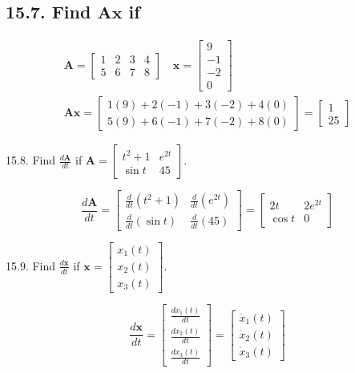 \documentclass[10pt]{article}
\begin{document}
\subsection*{15.7. Find $\mathbf{A x}$ if}
$$
\begin{gathered}
\mathbf{A}=\left[\begin{array}{llll}
1 & 2 & 3 & 4 \\
5 & 6 & 7 & 8
\end{array}\right] \quad \mathbf{x}=\left[\begin{array}{r}
9 \\
-1 \\
-2 \\
0
\end{array}\right] \\
\mathbf{A x}=\left[\begin{array}{c}
1(9)+2(-1)+3(-2)+4(0) \\
5(9)+6(-1)+7(-2)+8(0)
\end{array}\right]=\left[\begin{array}{c}
1 \\
25
\end{array}\right]
\end{gathered}
$$

15.8. Find $\frac{d \mathbf{A}}{d t}$ if $\mathbf{A}=\left[\begin{array}{cc}t^{2}+1 & e^{2 t} \\ \sin t & 45\end{array}\right]$.

$$
\frac{d \mathbf{A}}{d t}=\left[\begin{array}{ll}
\frac{d}{d t}\left(t^{2}+1\right) & \frac{d}{d t}\left(e^{2 t}\right) \\
\frac{d}{d t}(\sin t) & \frac{d}{d t}(45)
\end{array}\right]=\left[\begin{array}{cc}
2 t & 2 e^{2 t} \\
\cos t & 0
\end{array}\right]
$$

15.9. Find $\frac{d \mathbf{x}}{d t}$ if $\mathbf{x}=\left[\begin{array}{l}x_{1}(t) \\ x_{2}(t) \\ x_{3}(t)\end{array}\right]$.

$$
\frac{d \mathbf{x}}{d t}=\left[\begin{array}{c}
\frac{d x_{1}(t)}{d t} \\
\frac{d x_{2}(t)}{d t} \\
\frac{d x_{3}(t)}{d t}
\end{array}\right]=\left[\begin{array}{l}
\dot{x}_{1}(t) \\
\dot{x}_{2}(t) \\
\dot{x}_{3}(t)
\end{array}\right]
$$
\end{document}
